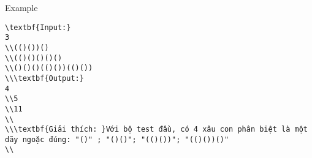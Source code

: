 Example
\begin{verbatim}
\textbf{Input:}
3
\\(()())()
\\(()()()()()
\\()()()(()())(()())
\\\textbf{Output:}
4
\\5
\\11
\\
\\\textbf{Giải thích: }Với bộ test đầu, có 4 xâu con phân biệt là một dãy ngoặc đúng: "()" ; "()()"; "(()())"; "(()())()"
\\\end{verbatim}